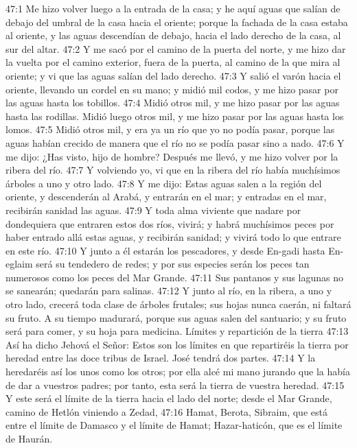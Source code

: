 47:1 Me hizo volver luego a la entrada de la casa; y he aquí aguas que salían de debajo del umbral de la casa hacia el oriente; porque la fachada de la casa estaba al oriente, y las aguas descendían de debajo, hacia el lado derecho de la casa, al sur del altar.   
47:2 Y me sacó por el camino de la puerta del norte, y me hizo dar la vuelta por el camino exterior, fuera de la puerta, al camino de la que mira al oriente; y vi que las aguas salían del lado derecho.   
47:3 Y salió el varón hacia el oriente, llevando un cordel en su mano; y midió mil codos, y me hizo pasar por las aguas hasta los tobillos.   
47:4 Midió otros mil, y me hizo pasar por las aguas hasta las rodillas. Midió luego otros mil, y me hizo pasar por las aguas hasta los lomos.   
47:5 Midió otros mil, y era ya un río que yo no podía pasar, porque las aguas habían crecido de manera que el río no se podía pasar sino a nado.   
47:6 Y me dijo: ¿Has visto, hijo de hombre? Después me llevó, y me hizo volver por la ribera del río.   
47:7 Y volviendo yo, vi que en la ribera del río había muchísimos árboles a uno y otro lado.   
47:8 Y me dijo: Estas aguas salen a la región del oriente, y descenderán al Arabá, y entrarán en el mar; y entradas en el mar, recibirán sanidad las aguas.   
47:9 Y toda alma viviente que nadare por dondequiera que entraren estos dos ríos, vivirá; y habrá muchísimos peces por haber entrado allá estas aguas, y recibirán sanidad; y vivirá todo lo que entrare en este río.   
47:10 Y junto a él estarán los pescadores, y desde En-gadi hasta En-eglaim será su tendedero de redes; y por sus especies serán los peces tan numerosos como los peces del Mar Grande.   
47:11 Sus pantanos y sus lagunas no se sanearán; quedarán para salinas.   
47:12 Y junto al río, en la ribera, a uno y otro lado, crecerá toda clase de árboles frutales; sus hojas nunca caerán, ni faltará su fruto. A su tiempo madurará, porque sus aguas salen del santuario; y su fruto será para comer, y su hoja para medicina.   
Límites y repartición de la tierra   
47:13 Así ha dicho Jehová el Señor: Estos son los límites en que repartiréis la tierra por heredad entre las doce tribus de Israel. José tendrá dos partes.   
47:14 Y la heredaréis así los unos como los otros; por ella alcé mi mano jurando que la había de dar a vuestros padres; por tanto, esta será la tierra de vuestra heredad.   
47:15 Y este será el límite de la tierra hacia el lado del norte; desde el Mar Grande, camino de Hetlón viniendo a Zedad,   
47:16 Hamat, Berota, Sibraim, que está entre el límite de Damasco y el límite de Hamat; Hazar-haticón, que es el límite de Haurán.   
